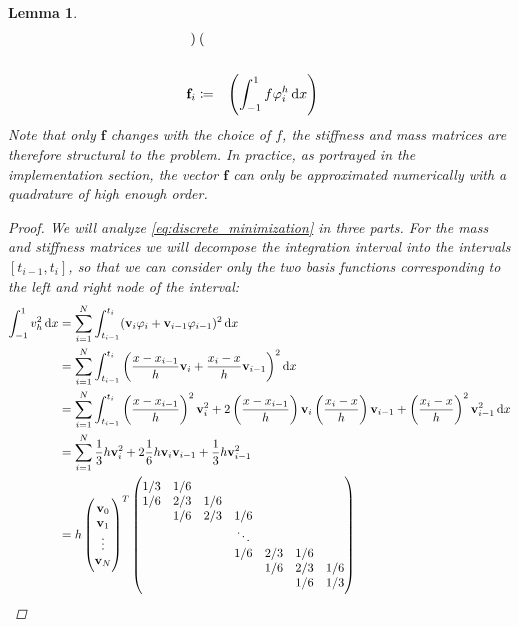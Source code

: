 \documentclass[headsepline,footsepline,footinclude=false,oneside,fontsize=11pt,paper=a4,listof=totoc,bibliography=totoc]{scrbook} %
\newtheorem{lemma}{Lemma}
\begin{document}
\begin{lemma}
\begin{align*}
\begin{pmatrix}
		\end{pmatrix} \\
		\\
		\mathbf{f}_i &\coloneqq \phantom{h} \left(\int_{-1}^1 f\varphi_i^h\dif x\right)
		\end{align*}
		Note that only $\mathbf{f}$ changes with the choice of $f$, the stiffness and mass matrices are therefore structural to the problem. In practice, as portrayed in the implementation section, the vector $\mathbf{f}$ can only be approximated numerically with a quadrature of high enough order.
		\begin{proof}
			We will analyze \eqref{eq:discrete_minimization} in three parts. For the mass and stiffness matrices we will decompose the integration interval into the intervals $[t_{i-1},t_i]$, so that we can consider only the two basis functions corresponding to the left and right node of the interval:
			\begin{align*}
				\int_{-1}^1 v_h^2 \dif x &= \sum_{i=1}^{N} \int_{t_{i-1}}^{t_i} (\mathbf{v}_i \varphi_i + \mathbf{v}_{i-1} \varphi_{i-1})^2 \dif x\\
				&= \sum_{i=1}^{N} \int_{t_{i-1}}^{t_i} \left(\frac{x-x_{i-1}}{h}\mathbf{v}_i + \frac{x_i-x}{h}\mathbf{v}_{i-1}\right)^2 \dif x \\
				&= \sum_{i=1}^{N} \int_{t_{i-1}}^{t_i} \left(\frac{x-x_{i-1}}{h}\right)^2 \mathbf{v}_i^2 + 2\left(\frac{x-x_{i-1}}{h}\right) \mathbf{v}_i \left(\frac{x_i-x}{h}\right) \mathbf{v}_{i-1} + \left(\frac{x_i-x}{h}\right)^2 \mathbf{v}_{i-1}^2 \dif x \\
				&= \sum_{i=1}^{N} \frac{1}{3}h \mathbf{v}_i^2 + 2\frac{1}{6}h\mathbf{v}_i \mathbf{v}_{i-1} + \frac{1}{3} h \mathbf{v}_{i-1}^2 \\
				&= h \begin{pmatrix}
					\mathbf{v}_0 \\					
					\mathbf{v}_1 \\
					\vdots \\
					\mathbf{v}_N 
				\end{pmatrix}^T
				\begin{pmatrix}
				1/3& 1/6 & & & & & \\
				1/6& 2/3& 1/6 & & & & \\
				& 1/6& 2/3& 1/6 & & & \\
				& & & \ddots & & & \\
				& & & 1/6& 2/3& 1/6 & \\
				& & & & 1/6& 2/3& 1/6 \\
				& & & & & 1/6& 1/3

\end{pmatrix}
\end{align*}
\end{proof}
\end{lemma}
\end{document}
